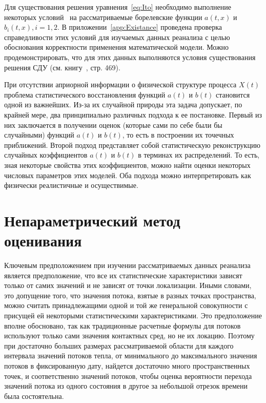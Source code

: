 Для существования решения уравнения~\eqref{eq:Ito} необходимо выполнение некоторых условий~\cite{Skorohod} на рассматриваемые борелевские функции $a(t, x)$ и $b_i(t, x), i=1,2$. В приложении~\ref{app:Existance} проведена проверка справедливости этих условий для изучаемых данных реанализа с целью обоснования корректности применения математической модели. Можно продемонстрировать, что для этих данных выполняются условия существования решения СДУ (см. книгу~\cite{Skorohod}, стр. 469). %

При отсутствии априорной информации о физической структуре процесса $X(t)$ проблема статистического восстановления функций $a(t)$ и $b(t)$ становится одной из важнейших. Из-за их случайной природы эта задача допускает, по крайней мере, два принципиально различных подхода к ее постановке. Первый из них заключается в получении оценок (которые сами по себе были бы случайными) функций $a(t)$ и $b(t)$, то есть в построении их точечных приближений. Второй подход представляет собой статистическую реконструкцию случайных коэффициентов $a(t)$ и $b(t)$ в терминах их распределений. То есть, зная некоторые свойства этих коэффициентов, можно найти оценки некоторых числовых параметров этих моделей. Оба подхода можно интерпретировать как физически реалистичные и осуществимые.

\section{Непараметрический метод оценивания}
\label{sec:Nonparametic}
Ключевым предположением при изучении рассматриваемых данных реанализа является предположение, что все их статистические характеристики зависят только от самих значений и не зависят от точки локализации. Иными словами, это допущение того, что значения потока, взятые в разных точках пространства, можно считать принадлежащими одной и той же генеральной совокупности с присущей ей некоторыми статистическими характеристиками. Это предположение вполне обосновано, так как традиционные расчетные формулы для потоков~\cite{cronin2019air,leyba2019trends} используют только сами значения контактных сред, но не их локацию. Поэтому при достаточно больших размерах рассматриваемой области для каждого интервала значений потоков тепла, от минимального до максимального значения потоков в фиксированную дату, найдется достаточно много пространственных точек, и соответственно значений потоков, чтобы оценка вероятности перехода значений потока из одного состояния в другое за небольшой отрезок времени была состоятельна.


